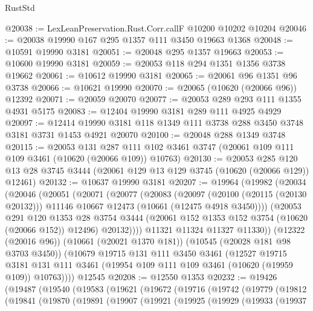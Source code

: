 \begin{lexlean}{RustStd}
\begin{coremodule}
@20038 := LexLeanPreservation.Rust.Corr.callF @10200 @10202 @10204
@20046 := @20038 @19990 @167 @295 @1357 @111 @3450 @19663 @1368
@20048 := @10591 @19990 @3181
@20051 := @20048 @295 @1357 @19663
@20053 := @10600 @19990 @3181
@20059 := @20053 @118 @294 @1351 @1356 @3738 @19662
@20061 := @10612 @19990 @3181
@20065 := @20061 @96 @1351 @96 @3738
@20066 := @10621 @19990
@20070 := @20065 (@10620 (@20066 @96)) @12392
@20071 := @20059 @20070
@20077 := @20053 @289 @293 @111 @1355 @4931 @5175
@20083 := @12404 @19990 @3181 @289 @111 @4925 @4929
@20097 := @12414 @19990 @3181 @118 @1349 @111 @3738 @288 @3450 @3748 @3181 @3731 @1453 @4921 @20070
@20100 := @20048 @288 @1349 @3748
@20115 := @20053
    @131
    @287
    @111
    @102
    @3461
    @3747
    (@20061 @109 @111 @109 @3461 (@10620 (@20066 @109)) @10763)
@20130 := @20053
    @285
    @120
    @13
    @28
    @3745
    @3444
    (@20061 @129 @13 @129 @3745 (@10620 (@20066 @129)) @12461)
@20132 := @10637 @19990 @3181
@20207 := @19964
    (@19982
      (@20034
        (@20046
          (@20051
            (@20071
              (@20077
                (@20083
                  (@20097
                    (@20100 (@20115 (@20130 @20132)))
                    @11146
                    @10667
                    @12473
                    (@10661 (@12475 @4918 @3450))))
                (@20053
                  @291
                  @120
                  @1353
                  @28
                  @3754
                  @3444
                  (@20061 @152 @1353 @152 @3754 (@10620 (@20066 @152)) @12496)
                  @20132))))
          @11321
          @11324
          @11327
          @11330))
      (@12322 (@20016 @96))
      (@10661 (@20021 @1370 @181))
      (@10545 (@20028 @181 @98 @3703 @3450))
      (@10679
        @19715
        @131
        @111
        @3450
        @3461
        (@12527
          @19715
          @3181
          @131
          @111
          @3461
          (@19954 @109 @111 @109 @3461 (@10620 (@19959 @109)) @10763))))
    @12545
@20208 := @12550 @1353
@20232 := @19426
    (@19487
      (@19540
        (@19583
          (@19621
            (@19672
              (@19716
                (@19742
                  (@19779
                    (@19812
                      (@19841
                        (@19870
                          (@19891
                            (@19907
                              (@19921
                                (@19925
                                  (@19929
                                    (@19933
                                      (@19937

\end{coremodule}
\end{lexlean}
